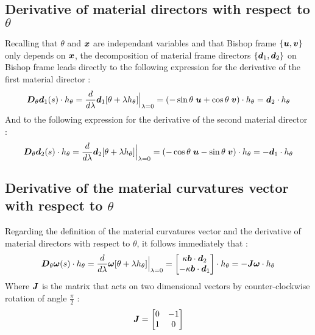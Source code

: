 \subsection{Derivative of material directors with respect to $\theta$}

Recalling that $\theta$ and $\boldsymbol{x}$ are independant variables and that Bishop frame $\{\boldsymbol{u},\boldsymbol{v}\}$ only depends on $\boldsymbol{x}$, the decomposition of material frame directors $\{\boldsymbol{d}_1,\boldsymbol{d}_2\}$ on Bishop frame leads directly to the following expression for the derivative of the first material director  :
\begin{equation}
			\boldsymbol{D}_\theta\boldsymbol{d}_1(s)\cdot h_\theta
	= \frac{d}{d\lambda} \boldsymbol{d}_1[\theta + \lambda h_\theta]\Bigr|_{\lambda = 0}
	= \left(-\sin{\theta}\;\boldsymbol{u} + \cos{\theta}\;\boldsymbol{v}\right) \cdot h_\theta
	= \boldsymbol{d}_2\cdot h_\theta \\
\end{equation}
And to the following expression for the derivative of the second material director : 
\begin{equation}
			\boldsymbol{D}_\theta\boldsymbol{d}_2(s)\cdot h_\theta
	= \frac{d}{d\lambda} \boldsymbol{d}_2[\theta + \lambda h_\theta]\Bigr|_{\lambda = 0}
	= \left(-\cos{\theta}\;\boldsymbol{u} - \sin{\theta}\;\boldsymbol{v}\right) \cdot h_\theta
	= -\boldsymbol{d}_1\cdot h_\theta \\
\end{equation}

\subsection{Derivative of the material curvatures vector with respect to $\theta$}
Regarding the definition of the material curvatures vector and the derivative of material directors with respect to $\theta$, it follows immediately that :
\begin{equation}
			\boldsymbol{D}_\theta\boldsymbol{\omega}(s)\cdot h_\theta
	= \frac{d}{d\lambda} \boldsymbol{\omega}[\theta + \lambda h_\theta]\Bigr|_{\lambda = 0}
	= \begin{bmatrix}
		\kappa\boldsymbol{b}\cdot\boldsymbol{d}_2\\
		-\kappa\boldsymbol{b}\cdot\boldsymbol{d}_1\\
	\end{bmatrix}\cdot h_\theta
	= - \boldsymbol{\mathit{J}}\boldsymbol{\omega}\cdot h_\theta\\
\end{equation}
Where $\boldsymbol{\mathit{J}}$ is the matrix that acts on
two dimensional vectors by counter-clockwise rotation of angle $\frac{\pi}{2}$ : 
\begin{equation}
	\boldsymbol{\mathit{J}} = \begin{bmatrix}
			0	&	-1\\
			1	&	0\\
		\end{bmatrix}
\end{equation}

